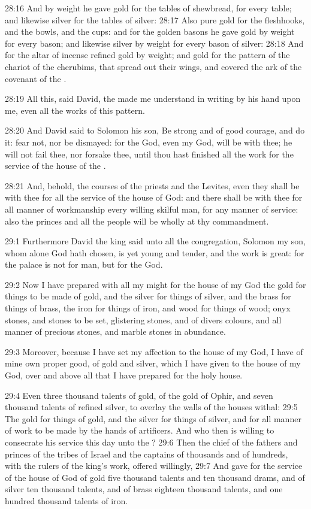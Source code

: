 28:16 And by weight he gave gold for the tables of shewbread, for
every table; and likewise silver for the tables of silver: 28:17 Also
pure gold for the fleshhooks, and the bowls, and the cups: and for the
golden basons he gave gold by weight for every bason; and likewise
silver by weight for every bason of silver: 28:18 And for the altar of
incense refined gold by weight; and gold for the pattern of the
chariot of the cherubims, that spread out their wings, and covered the
ark of the covenant of the \LORD.

28:19 All this, said David, the \LORD made me understand in writing by
his hand upon me, even all the works of this pattern.

28:20 And David said to Solomon his son, Be strong and of good
courage, and do it: fear not, nor be dismayed: for the \LORD God, even
my God, will be with thee; he will not fail thee, nor forsake thee,
until thou hast finished all the work for the service of the house of
the \LORD.

28:21 And, behold, the courses of the priests and the Levites, even
they shall be with thee for all the service of the house of God: and
there shall be with thee for all manner of workmanship every willing
skilful man, for any manner of service: also the princes and all the
people will be wholly at thy commandment.

29:1 Furthermore David the king said unto all the congregation,
Solomon my son, whom alone God hath chosen, is yet young and tender,
and the work is great: for the palace is not for man, but for the \LORD
God.

29:2 Now I have prepared with all my might for the house of my God the
gold for things to be made of gold, and the silver for things of
silver, and the brass for things of brass, the iron for things of
iron, and wood for things of wood; onyx stones, and stones to be set,
glistering stones, and of divers colours, and all manner of precious
stones, and marble stones in abundance.

29:3 Moreover, because I have set my affection to the house of my God,
I have of mine own proper good, of gold and silver, which I have given
to the house of my God, over and above all that I have prepared for
the holy house.

29:4 Even three thousand talents of gold, of the gold of Ophir, and
seven thousand talents of refined silver, to overlay the walls of the
houses withal: 29:5 The gold for things of gold, and the silver for
things of silver, and for all manner of work to be made by the hands
of artificers. And who then is willing to consecrate his service this
day unto the \LORD?  29:6 Then the chief of the fathers and princes of
the tribes of Israel and the captains of thousands and of hundreds,
with the rulers of the king's work, offered willingly, 29:7 And gave
for the service of the house of God of gold five thousand talents and
ten thousand drams, and of silver ten thousand talents, and of brass
eighteen thousand talents, and one hundred thousand talents of iron.


